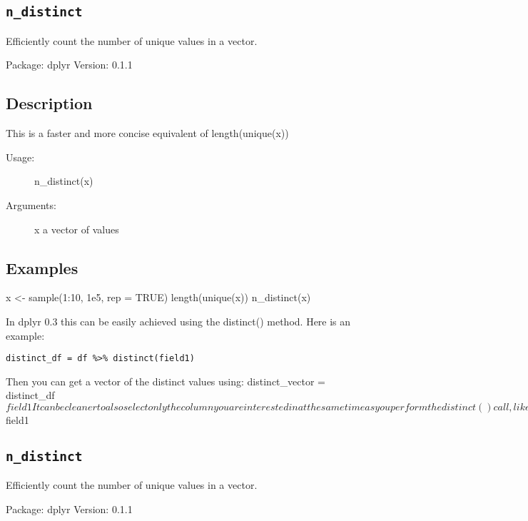 
\subsection{\texttt{n_distinct}}

Efficiently count the number of unique values in a vector.


Package:  dplyr
Version:  0.1.1

\subsection{Description}
This is a faster and more concise equivalent of length(unique(x))


\begin{description}
\item[Usage:] n_distinct(x)

\item[Arguments:] x a vector of values
\end{description}
\subsection{Examples}

x <- sample(1:10, 1e5, rep = TRUE)
length(unique(x))
n_distinct(x)


In dplyr 0.3 this can be easily achieved using the distinct() method. Here is an example:

\begin{verbatim}
distinct_df = df %>% distinct(field1)
\end{verbatim}
Then you can get a vector of the distinct values using: 
distinct_vector = distinct_df$field1

It can be cleaner to also select only the column you are interested in at the same time as you perform the distinct() call, like so:


distinct_df = df %
distinct_vector = distinct_df$field1


\subsection{\texttt{n_distinct}}

Efficiently count the number of unique values in a vector.


Package:  dplyr
Version:  0.1.1

